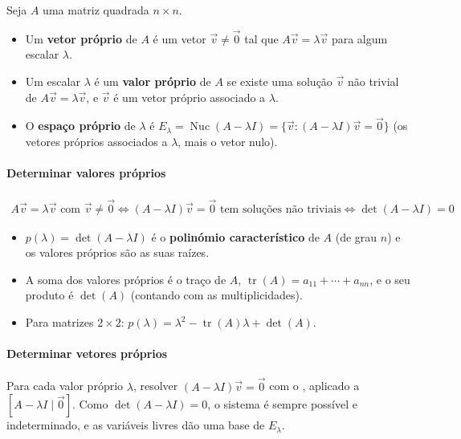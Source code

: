 \documentclass{article}
\begin{document}
Seja $A$ uma matriz quadrada $n \times n$.

\begin{itemize}
    \item Um \textbf{vetor próprio} de $A$ é um vetor $\vec{v} \neq \vec{0}$ tal que $A\vec{v} = \lambda\vec{v}$
    para algum escalar $\lambda$.
    \item Um escalar $\lambda$ é um \textbf{valor próprio} de $A$ se existe uma solução $\vec{v}$ não trivial de
    $A\vec{v} = \lambda\vec{v}$, e $\vec{v}$ é um vetor próprio associado a $\lambda$.
    \item O \textbf{espaço próprio} de $\lambda$ é
    $E_\lambda = \operatorname{Nuc}(A - \lambda I) = \{ \vec{v} : (A - \lambda I)\vec{v} = \vec{0} \}$
    (os vetores próprios associados a $\lambda$, mais o vetor nulo).
\end{itemize}

\paragraph{Determinar valores próprios}

\begin{gather*}
A\vec{v} = \lambda\vec{v} \text{ com } \vec{v} \neq \vec{0}
\iff (A - \lambda I)\vec{v} = \vec{0} \text{ tem soluções não triviais}
\iff \boxed{\det(A - \lambda I) = 0}
\end{gather*}

\begin{itemize}
    \item $p(\lambda) = \det(A - \lambda I)$ é o \textbf{polinómio característico} de $A$ (de grau $n$) e os
    valores próprios são as suas raízes.
    \item A soma dos valores próprios é o traço de $A$, $\operatorname{tr}(A) = a_{11} + \cdots + a_{nn}$, e o
    seu produto é $\det(A)$ (contando com as multiplicidades).
    \item Para matrizes $2 \times 2$: $p(\lambda) = \lambda^2 - \operatorname{tr}(A)\lambda + \det(A)$.
\end{itemize}

\paragraph{Determinar vetores próprios}

Para cada valor próprio $\lambda$, resolver $(A - \lambda I)\vec{v} = \vec{0}$ com o
, aplicado a $[A - \lambda I \mid \vec{0}]$. Como
$\det(A - \lambda I) = 0$, o sistema é sempre possível e indeterminado, e as variáveis livres dão uma base
de $E_\lambda$.
\end{document}
